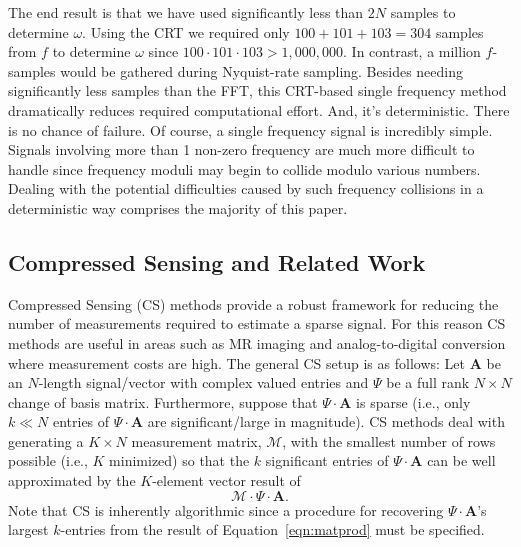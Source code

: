 \documentclass{article}
\begin{document}
The end result is that we have used significantly less than $2N$ samples to determine $\omega$.  Using the CRT we required only $100 + 101 + 103 = 304$ samples from $f$ to determine $\omega$ since $100 \cdot 101 \cdot 103 > 1,000,000$.  In contrast, a million $f$-samples would be gathered during Nyquist-rate sampling.  Besides needing significantly less samples than the FFT, this CRT-based single frequency method dramatically reduces required computational effort.  And, it's deterministic.  There is no chance of failure.  Of course, a single frequency signal is incredibly simple.  Signals involving more than 1 non-zero frequency are much more difficult to handle since frequency moduli may begin to collide modulo various numbers.  Dealing with the potential difficulties caused by such frequency collisions in a deterministic way comprises the majority of this paper.

\subsection{Compressed Sensing and Related Work}

Compressed Sensing (CS) methods \cite{CS1,CS2,CMDetCS3,CMDetCS1,CMDetCS2} provide a robust framework for reducing the number of measurements required to estimate a sparse signal.  For this reason CS methods are useful in areas such as MR imaging \cite{MRI1, MRI2} and analog-to-digital conversion \cite{SigApp1,SigApp2} where measurement costs are high.  The general CS setup is as follows:  Let \textbf{A} be an $N$-length signal/vector with complex valued entries and $\Psi$ be a full rank $N \times N$ change of basis matrix.  Furthermore, suppose that $\Psi \cdot \textbf{A}$ is sparse (i.e., only $k \ll N$ entries of $\Psi \cdot \textbf{A}$ are significant/large in magnitude).  CS methods deal with generating a $K \times N$ measurement matrix, $\mathcal{M}$, with the smallest number of rows possible (i.e., $K$ minimized) so that the $k$ significant entries of $\Psi \cdot \textbf{A}$ can be well approximated by the $K$-element vector result of
\begin{equation}
\mathcal{M} \cdot \Psi \cdot \textbf{A}.
\label{eqn:matprod}
\end{equation}
Note that CS is inherently algorithmic since a procedure for recovering $\Psi \cdot \textbf{A}$'s largest $k$-entries from the result of Equation~\ref{eqn:matprod} must be specified.  
\end{document}

